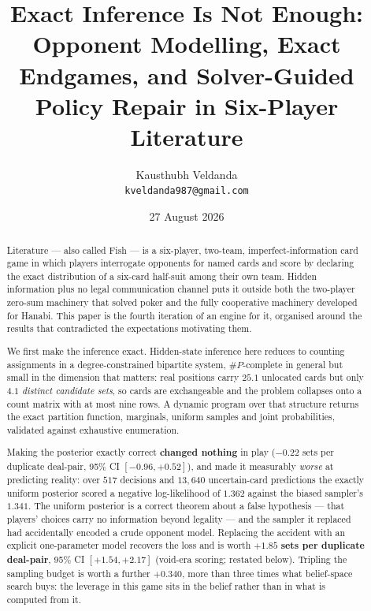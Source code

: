\documentclass[11pt,a4paper]{article}
\title{\vspace{-1.6cm}\bfseries Exact Inference Is Not Enough:\\[0.1em]
\large Opponent Modelling, Exact Endgames, and Solver-Guided Policy Repair
in Six-Player Literature\vspace{-0.2em}}
\author{\normalsize Kausthubh Veldanda\\[-0.2em]
\small\texttt{kveldanda987@gmail.com}}
\date{\small 27 August 2026\vspace{-0.4em}}
\begin{document}
\maketitle
\vspace{-2.8em}

\begin{abstract}
\small{}\setlength{\parskip}{0pt}\noindent
Literature --- also called Fish --- is a six-player, two-team,
imperfect-information card game in which players interrogate opponents for
named cards and score by declaring the exact distribution of a six-card
half-suit among their own team. Hidden information plus no legal communication
channel puts it outside both the two-player zero-sum machinery that solved
poker and the fully cooperative machinery developed for Hanabi. This paper is
the fourth iteration of an engine for it, organised around the results that
contradicted the expectations motivating them.

We first make the inference exact. Hidden-state inference here reduces to counting assignments in a
degree-constrained bipartite system, $\#P$-complete in general but small in the
dimension that matters: real positions carry $25.1$ unlocated cards but only
$4.1$ \emph{distinct candidate sets}, so cards are exchangeable and the problem
collapses onto a count matrix with at most nine rows. A dynamic program over
that structure returns the exact partition function, marginals, uniform samples
and joint probabilities, validated against exhaustive enumeration.

Making the posterior exactly correct \textbf{changed nothing} in play
($-0.22$ sets per duplicate deal-pair, 95\% CI $[-0.96, +0.52]$), and made it
measurably \emph{worse} at predicting reality: over $517$ decisions and
$13{,}640$ uncertain-card predictions the exactly uniform posterior scored a
negative log-likelihood of $1.362$ against the biased sampler's $1.341$. The
uniform posterior is a correct theorem about a false hypothesis --- that
players' choices carry no information beyond legality --- and the sampler it
replaced had accidentally encoded a crude opponent model. Replacing the
accident with an explicit one-parameter model recovers the loss and is worth
$\mathbf{+1.85}$ \textbf{sets per duplicate deal-pair}, 95\% CI
$[+1.54, +2.17]$ (void-era scoring; restated below). Tripling the sampling budget is worth a further $+0.340$, more than three
times what belief-space search buys: the leverage in this game sits in the
belief rather than in what is computed from it.


\end{abstract}
\end{document}
